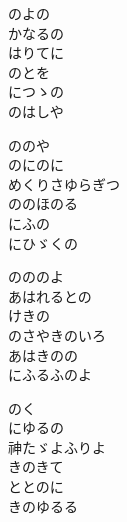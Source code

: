 \documentclass[10pt,b5j]{tarticle} %
\begin{document}
\vspace{1.5em} %
\newcommand{\linespace}{0.5em} %
\newcommand{\blocksize}{0.5\hsize} %
\begin{enumerate} %
    \begin{minipage}[c]{\blocksize}
    
        \vspace{\linespace}
        \item
        のよの\\
        かなるの\\
        はりてに\\
        のとを\\
        につゝの\\
        のはしや
        
        \vspace{\linespace}
        \item
        ののや\\
        のにのに\\
        めくりさゆらぎつ\\
        ののほのる\\
        にふの\\
        にひゞくの
        
        \vspace{\linespace}
        \item
        のののよ\\
        あはれるとの\\
        けきの\\
        のさやきのいろ\\
        あはきのの\\
        にふるふのよ
        
        \vspace{\linespace}
        \item
        のく\\
        にゆるの\\
        神たゞよふりよ\\
        きのきて\\
        ととのに\\
        きのゆるる
    
    \end{minipage}
\end{enumerate} %
\end{document}
